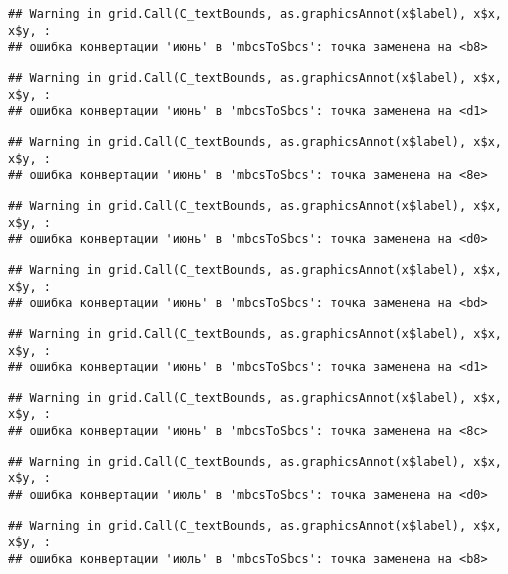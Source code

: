 \documentclass[
]{article}
\begin{document}
\begin{verbatim}
## Warning in grid.Call(C_textBounds, as.graphicsAnnot(x$label), x$x, x$y, :
## ошибка конвертации 'июнь' в 'mbcsToSbcs': точка заменена на <b8>
\end{verbatim}

\begin{verbatim}
## Warning in grid.Call(C_textBounds, as.graphicsAnnot(x$label), x$x, x$y, :
## ошибка конвертации 'июнь' в 'mbcsToSbcs': точка заменена на <d1>
\end{verbatim}

\begin{verbatim}
## Warning in grid.Call(C_textBounds, as.graphicsAnnot(x$label), x$x, x$y, :
## ошибка конвертации 'июнь' в 'mbcsToSbcs': точка заменена на <8e>
\end{verbatim}

\begin{verbatim}
## Warning in grid.Call(C_textBounds, as.graphicsAnnot(x$label), x$x, x$y, :
## ошибка конвертации 'июнь' в 'mbcsToSbcs': точка заменена на <d0>
\end{verbatim}

\begin{verbatim}
## Warning in grid.Call(C_textBounds, as.graphicsAnnot(x$label), x$x, x$y, :
## ошибка конвертации 'июнь' в 'mbcsToSbcs': точка заменена на <bd>
\end{verbatim}

\begin{verbatim}
## Warning in grid.Call(C_textBounds, as.graphicsAnnot(x$label), x$x, x$y, :
## ошибка конвертации 'июнь' в 'mbcsToSbcs': точка заменена на <d1>
\end{verbatim}

\begin{verbatim}
## Warning in grid.Call(C_textBounds, as.graphicsAnnot(x$label), x$x, x$y, :
## ошибка конвертации 'июнь' в 'mbcsToSbcs': точка заменена на <8c>
\end{verbatim}

\begin{verbatim}
## Warning in grid.Call(C_textBounds, as.graphicsAnnot(x$label), x$x, x$y, :
## ошибка конвертации 'июль' в 'mbcsToSbcs': точка заменена на <d0>
\end{verbatim}

\begin{verbatim}
## Warning in grid.Call(C_textBounds, as.graphicsAnnot(x$label), x$x, x$y, :
## ошибка конвертации 'июль' в 'mbcsToSbcs': точка заменена на <b8>
\end{verbatim}
\end{document}

